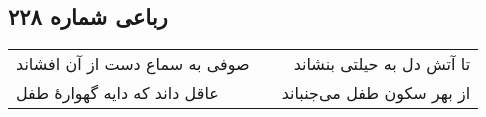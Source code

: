 \begin{center}
\section*{رباعی شماره ۲۲۸}
\label{sec:sh228}
\begin{longtable}{l p{0.5cm} r}
صوفی به سماع دست از آن افشاند
&&
تا آتش دل به حیلتی بنشاند
\\
عاقل داند که دایه گهوارهٔ طفل
&&
از بهر سکون طفل می‌جنباند
\\
\end{longtable}
\end{center}
